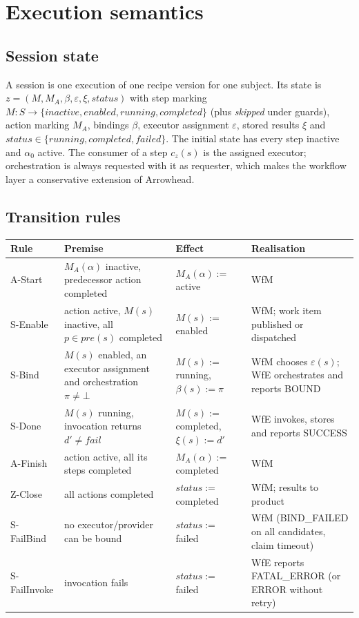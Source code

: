 \documentclass[a4paper]{arrowhead}
\begin{document}
\section{Execution semantics}
\label{sec:semantics}
\subsection{Session state}
A session is one execution of one recipe version for one subject. Its state is
$z = (M, M_A, \beta, \varepsilon, \xi, status)$ with step marking $M: S \rightarrow \{inactive, enabled, running,
completed\}$ (plus \emph{skipped} under guards), action marking $M_A$, bindings $\beta$, executor assignment
$\varepsilon$, stored results $\xi$ and $status \in \{running, completed, failed\}$. The initial state has every step
inactive and $\alpha_0$ active. The consumer of a step $c_z(s)$ is the assigned executor; orchestration is always
requested with it as requester, which makes the workflow layer a conservative extension of Arrowhead.

\subsection{Transition rules}

{\small
\begin{longtable}{|p{2.0cm}|p{5.4cm}|p{3.6cm}|p{4.8cm}|}

\hline
\rowcolor{gray!33} Rule & Premise & Effect & Realisation \\ \hline
\endhead
A-Start & $M_A(\alpha)$ inactive, predecessor action completed & $M_A(\alpha) :=$ active & WfM \\ \hline
S-Enable & action active, $M(s)$ inactive, all $p \in pre(s)$ completed & $M(s) :=$ enabled & WfM; work item published or dispatched \\ \hline
S-Bind & $M(s)$ enabled, an executor assignment and orchestration $\pi \neq \bot$ & $M(s) :=$ running, $\beta(s) := \pi$ & WfM chooses $\varepsilon(s)$; WfE orchestrates and reports BOUND \\ \hline
S-Done & $M(s)$ running, invocation returns $d' \neq fail$ & $M(s) :=$ completed, $\xi(s) := d'$ & WfE invokes, stores and reports SUCCESS \\ \hline
A-Finish & action active, all its steps completed & $M_A(\alpha) :=$ completed & WfM \\ \hline
Z-Close & all actions completed & $status :=$ completed & WfM; results to product \\ \hline
S-FailBind & no executor/provider can be bound & $status :=$ failed & WfM (BIND\_FAILED on all candidates, claim timeout) \\ \hline
S-FailInvoke & invocation fails & $status :=$ failed & WfE reports FATAL\_ERROR (or ERROR without retry) \\ \hline
\end{longtable}
}
\end{document}
